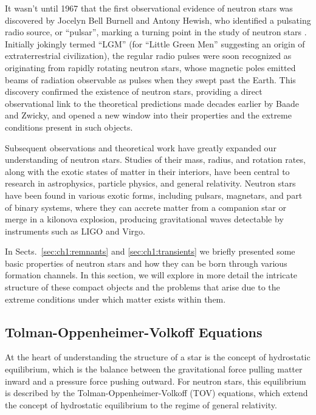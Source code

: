 \documentclass[main.tex]{subfiles}
\begin{document}
    It wasn't until 1967 that the first observational evidence of neutron stars was discovered by Jocelyn Bell Burnell and Antony Hewish, who identified a pulsating radio source, or ``pulsar'', marking a turning point in the study of neutron stars \citep{1968Natur.217..709H}. Initially jokingly termed ``LGM'' (for ``Little Green Men'' suggesting an origin of extraterrestrial civilization), the regular radio pulses were soon recognized as originating from rapidly rotating neutron stars, whose magnetic poles emitted beams of radiation observable as pulses when they swept past the Earth. This discovery confirmed the existence of neutron stars, providing a direct observational link to the theoretical predictions made decades earlier by Baade and Zwicky, and opened a new window into their properties and the extreme conditions present in such objects.

    Subsequent observations and theoretical work have greatly expanded our understanding of neutron stars. Studies of their mass, radius, and rotation rates, along with the exotic states of matter in their interiors, have been central to research in astrophysics, particle physics, and general relativity. Neutron stars have been found in various exotic forms, including pulsars, magnetars, and part of binary systems, where they can accrete matter from a companion star or merge in a kilonova explosion, producing gravitational waves detectable by instruments such as LIGO and Virgo.

    In Sects.~\ref{sec:ch1:remnants} and \ref{sec:ch1:transients} we briefly presented some basic properties of neutron stars and how they can be born through various formation channels. In this section, we will explore in more detail the intricate structure of these compact objects and the problems that arise due to the extreme conditions under which matter exists within them.

    \subsection{Tolman-Oppenheimer-Volkoff Equations}
    At the heart of understanding the structure of a star is the concept of hydrostatic equilibrium, which is the balance between the gravitational force pulling matter inward and a pressure force pushing outward. For neutron stars, this equilibrium is described by the Tolman-Oppenheimer-Volkoff (TOV) equations, which extend the concept of hydrostatic equilibrium to the regime of general relativity.
\end{document}
